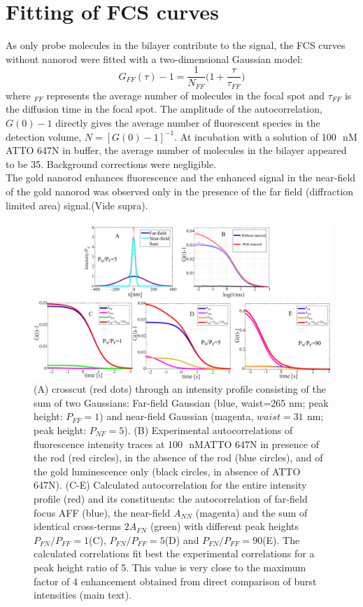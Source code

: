 \documentclass[11pt,a4paper,onecolumn]{article}
\newcommand{\nm}{\ensuremath{\,\textrm{nm}}}
\newcommand{\nM}{\ensuremath{\,\textrm{nM}}}
\begin{document}
\section{Fitting of FCS curves}
As only probe molecules in the bilayer contribute to the signal, the FCS curves without nanorod
were fitted with a two-dimensional Gaussian model:
\begin{equation}
	G_{FF}(\tau)-1 = \frac{1}{N_{FF}}\Bigg(1+\frac{\tau}{\tau_{FF}}\Bigg)
	\label{eq:2Dgauss}
\end{equation}
where $_{FF}$ represents the average number of molecules in the focal spot and $\tau_{FF}$ is the diffusion time in the focal spot. The amplitude of the autocorrelation, $G(0)-1$ directly gives the average number of fluorescent species in the detection volume, $N=[G(0)-1]^{-1}$. At incubation with a solution of 100~\nM ATTO 647N in buffer, the average number of molecules in the bilayer appeared to be 35. Background corrections were negligible.\\
The gold nanorod enhances fluorescence and the enhanced signal in the near-field of the gold nanorod was observed only in the presence of the far field (diffraction limited area) signal.(Vide supra).\\
\begin{figure}[ht]
  \centering
  \includegraphics[width=\textwidth]{calc_enhc_corr.png}
  \makeatletter
  \renewcommand{\fnum@figure}{\figurename~S\thefigure}
  \makeatother{}
  \caption{(A) crosscut (red dots) through an intensity profile consisting of the sum of two Gaussians: Far-field Gaussian (blue, waist=265 nm; peak height: $P_{FF}=1$) and near-field Gaussian (magenta, $waist=31~\nm$; peak height: $P_{NF}=5$). (B) Experimental autocorrelations of fluorescence intensity traces at 100~\nM ATTO 647N in presence of the rod (red circles), in the absence of the rod (blue circles), and of the gold luminescence only (black circles, in absence of ATTO 647N). (C-E) Calculated autocorrelation for the entire intensity profile (red) and its constituents: the autocorrelation of far-field focus AFF (blue), the near-field $A_{NN}$ (magenta) and the sum of identical cross-terms $2A_{FN}$ (green) with different peak heights $P_{FN}/P_{FF}=1$(C), $P_{FN}/P_{FF}=5$(D) and $P_{FN}/P_{FF}=90$(E). The calculated correlations fit best the experimental correlations for a peak height ratio of 5. This value is very close to the maximum factor of 4 enhancement obtained from direct comparison of burst intensities (main text).}
  \label{SIfig:calc_enhc_corr}
\end{figure}
\end{document}
